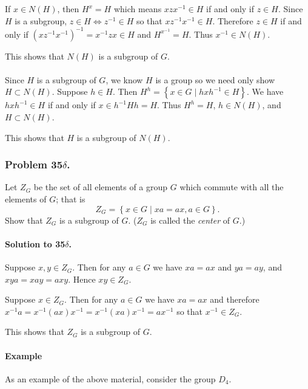 If $x \in N(H)$, then $H^x=H$ which means $xzx^{-1} \in H$ if and only if
$z \in H$. Since $H$ is a subgroup, $z \in H \Leftrightarrow z^{-1} \in H$ so that
$xz^{-1}x^{-1} \in H$. Therefore $z \in H$ if and only if
$(xz^{-1}x^{-1})^{-1} = x^{-1}zx \in H$ and $H^{x^{-1}} = H$. Thus $x^{-1} \in N(H)$.

This shows that $N(H)$ is a subgroup of $G$.

\paragraph{}
Since $H$ is a subgroup of $G$, we know $H$ is a group so we need only show
$H \subset N(H)$. Suppose $h \in H$. Then $H^h = \left\{x \in G \mid hxh^{-1} \in H \right\}$.
We have $hxh^{-1} \in H$ if and only if $x \in h^{-1}Hh = H$. Thus $H^h=H$,
$h\in N(H)$, and $H \subset N(H)$.

This shows that $H$ is a subgroup of $N(H)$.

\subsubsection{Problem 35$\delta$.}
Let $Z_G$ be the set of all elements of a group $G$ which commute with all the
elements of $G$; that is
$$ Z_G = \left\{ x \in G \mid xa = ax, a\in G \right\}.$$
Show that $Z_G$ is a subgroup of $G$. ($Z_G$ is called the \textit{center} of $G$.)

\paragraph*{Solution to 35$\delta$.}
Suppose $x, y \in Z_G$. Then for any $a\in G$ we have $xa=ax$ and $ya=ay$, and
$xya=xay=axy$. Hence $xy \in Z_G$.

Suppose $x \in Z_G$. Then for any $a\in G$ we have $xa=ax$ and therefore
$x^{-1}a=x^{-1}(ax)x^{-1}=x^{-1}(xa)x^{-1}=ax^{-1}$ so that $x^{-1} \in Z_G$.

This shows that $Z_G$ is a subgroup of $G$.

\paragraph{Example}
As an example of the above material, consider the group $D_4$.

